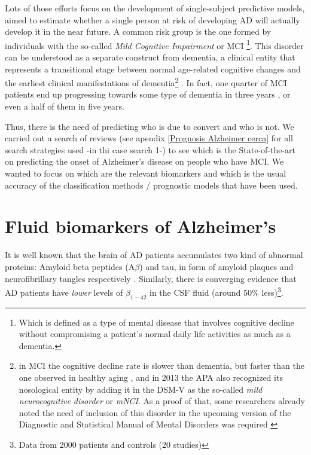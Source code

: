 \documentclass[a4paper,12pt]{elsarticle}  %
\begin{document}
Lots of those efforts focus on the development of single-subject predictive models, aimed to estimate whether a single person at risk of developing AD will actually develop it in the near future. A common risk group is the one formed by individuals with the so-called \textit{Mild Cognitive Impairment} or MCI \footnote{Which is defined as a type of mental disease that involves cognitive decline without compromising a patient's normal daily life activities as much as a dementia.}. This disorder can be understood as a separate construct from dementia, a clinical entity that represents a transitional stage between normal age-related cognitive changes and the earliest clinical manifestations of dementia\footnote{in MCI the cognitive decline rate is slower than dementia, but faster than the one observed in healthy aging \cite{Petersen1999303}, and in 2013 the APA also recognized its nosological entity by adding it in the DSM-V as the so-called \textit{mild neurocognitive disorder} or \textit{mNCI}\cite{DSM-V-GOOGLESCHOLAR-CITARMILLOR}. As a proof of that, some researchers already noted the need of inclusion of this disorder in the upcoming version of the Diagnostic and Statistical Manual of Mental Disorders was required \cite{Petersen2006147}} \cite{Petersen2006147, Petersen2004183}. In fact, one quarter of MCI patients end up progressing towards some type of dementia in three years \cite{Kaduszkiewicz2014158}, or even a half of them in five years\cite{Gauthier20061262}.

Thus, there is the need of predicting who is due to convert and who is not. We carried out a search of reviews (see apendix \ref{Prognosis Alzheimer cerca} for all search strategies used -in thi case search 1-)  to see which is the State-of-the-art on predicting the onset of Alzheimer's disease on people who have MCI. We wanted to focus on which are the relevant biomarkers and which is the usual accuracy of the classification methods / prognostic models that have been used.

\section{Fluid biomarkers of Alzheimer's}  
  It is well known that the brain of AD patients accumulates two kind of abnormal proteins: Amyloid beta peptides (A$\beta$) and tau, in form of amyloid plaques and neurofibrillary tangles respectively \cite{Rathore2017530}. Similarly, there is converging evidence that AD patients have \textit{lower} levels of $\beta_{1-42}$ in the CSF fluid (around 50\% less)\cite{Henriques2018}\footnote{Data from 2000 patients and controls (20 studies)}.
  
\end{document}
